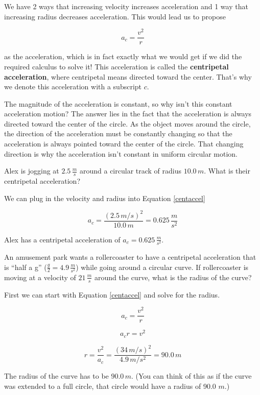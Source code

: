 \documentclass[12pt]{book}
\begin{document}
We have 2 ways that increasing velocity increases acceleration and 1 way that increasing radius decreases acceleration. This would lead us to propose

\begin{equation}
a_c = \frac{v^2}{r}
\label{centaccel}
\end{equation}

as the acceleration, which is in fact exactly what we would get if we did the required calculus to solve it! This acceleration is called the \textbf{centripetal acceleration}, where centripetal means directed toward the center. That's why we denote this acceleration with a subscript $c$.

The magnitude of the acceleration is constant, so why isn't this constant acceleration motion? The answer lies in the fact that the acceleration is always directed toward the center of the circle. As the object moves around the circle, the direction of the acceleration must be constantly changing so that the acceleration is always pointed toward the center of the circle. That changing direction is why the acceleration isn't constant in uniform circular motion.

\begin{exampleblock}
Alex is jogging at $2.5 \, \frac{m}{s}$ around a circular track of radius $10.0 \, m$. What is their centripetal acceleration?

We can plug in the velocity and radius into Equation \ref{centaccel}

\begin{equation}
a_c = \frac{(2.5 \, m/s)^2}{10.0 \, m} = 0.625 \, \frac{m}{s^2}
\end{equation}

Alex has a centripetal acceleration of $a_c = 0.625 \, \frac{m}{s^2}$.
\end{exampleblock}

\begin{exampleblock}
An amusement park wants a rollercoaster to have a centripetal acceleration that is ``half a g'' ($\frac{g}{2} = 4.9 \, \frac{m}{s^2}$) while going around a circular curve. If rollercoaster is moving at a velocity of $21 \, \frac{m}{s}$ around the curve, what is the radius of the curve?

First we can start with Equation \ref{centaccel} and solve for the radius.

\begin{equation}
a_c = \frac{v^2}{r}
\end{equation}

\begin{equation}
a_c r = v^2
\end{equation}

\begin{equation}
r = \frac{v^2}{a_c} = \frac{(34 \, m/s)^2}{4.9 \, m/s^2} = 90.0 \, m
\end{equation}

The radius of the curve has to be $90.0 \, m$. (You can think of this as if the curve was extended to a full circle, that circle would have a radius of 90.0 $m$.)
\end{exampleblock}
\end{document}
